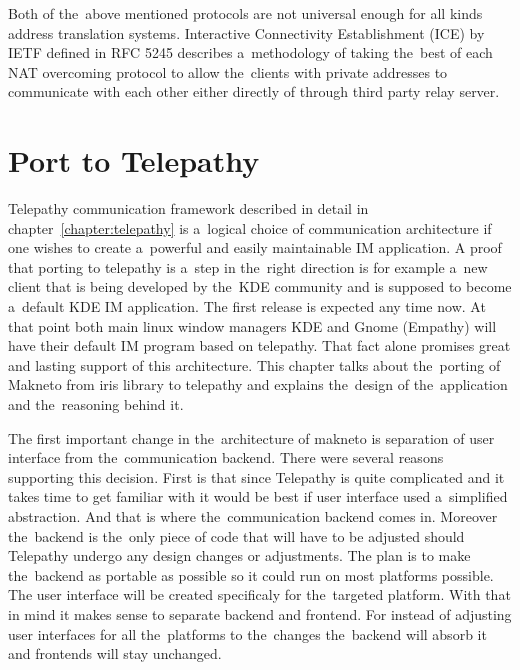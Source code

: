 Both of the~above mentioned protocols are not universal enough for all kinds address translation systems. Interactive Connectivity Establishment (ICE) by IETF defined in RFC 5245 describes a~methodology of taking the~best of each NAT overcoming protocol to allow the~clients with private addresses to communicate with each other either directly of through third party relay server.  


\chapter{Port to Telepathy}\label{chapter:port-to-telepathy}
Telepathy communication framework described in detail in chapter~\ref{chapter:telepathy} is a~logical choice of communication architecture if one wishes to create a~powerful and easily maintainable IM application. A proof that porting to telepathy is a~step in the~right direction is for example a~new client that is being developed by the~KDE community and is supposed to become a~default KDE IM application. The first release is expected any time now. At that point both main linux window managers KDE and Gnome (Empathy) will have their default IM program based on telepathy. That fact alone promises great and lasting support of this architecture. This chapter talks about the~porting of Makneto from iris library to telepathy and explains the~design of the~application and the~reasoning behind it.

The first important change in the~architecture of makneto is separation of user interface from the~communication backend. There were several reasons supporting this decision. First is that since Telepathy is quite complicated and it takes time to get familiar with it would be best if user interface used a~simplified abstraction. And that is where the~communication backend comes in. Moreover the~backend is the~only piece of code that will have to be adjusted should Telepathy undergo any design changes or adjustments. The plan is to make the~backend as portable as possible so it could run on most platforms possible. The user interface will be created specificaly for the~targeted platform. With that in mind it makes sense to separate backend and frontend. For instead of adjusting user interfaces for all the~platforms to the~changes the~backend will absorb it and frontends will stay unchanged. 

